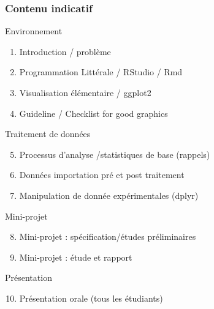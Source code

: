 \documentclass[xcolor=x11names,compress,8pt]{beamer}
\renewcommand{\(}{\begin{columns}}
\renewcommand{\)}{\end{columns}}
\newcommand{\<}[1]{\begin{column}{#1}}
\renewcommand{\>}{\end{column}}
\begin{document}
\begin{frame}
\frametitle{Contenu indicatif}

\begin{block}{Environnement }  
\begin{enumerate}
\item Introduction / problème 
\item Programmation Littérale / RStudio / Rmd
\item Visualisation élémentaire / ggplot2
\item Guideline / Checklist for good graphics
\end{enumerate}
\end{block}
\begin{block}{Traitement de données}
\begin{enumerate}
\setcounter{enumi}{4} 
\item Processus d'analyse /statistiques de base (rappels)
\item Données importation pré et post traitement
\item Manipulation de donnée expérimentales (dplyr)
\end{enumerate}
\end{block}
\begin{block}{Mini-projet} 
\begin{enumerate}
\setcounter{enumi}{7} 
\item Mini-projet  : spécification/études préliminaires
\item Mini-projet : étude et rapport
\end{enumerate}
\end{block}
\begin{block}{Présentation} 
\begin{enumerate}
\setcounter{enumi}{9} 
\item Présentation orale (tous les étudiants)
\end{enumerate}
\end{block}

\end{frame} 
\end{document}
